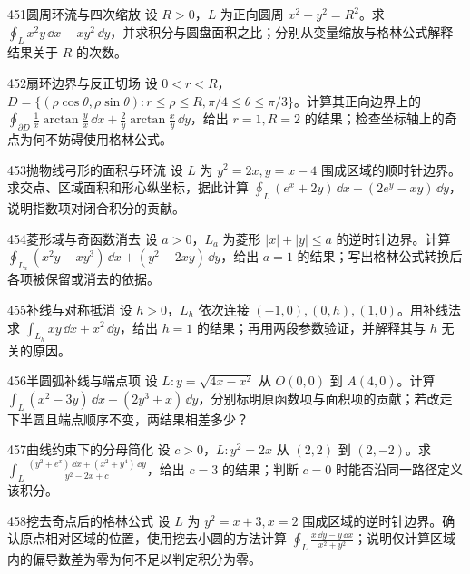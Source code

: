 \begin{exercise}{451}{圆周环流与四次缩放}
设 $R>0$，$L$ 为正向圆周 $x^2+y^2=R^2$。求 $\oint_Lx^2y\,\dd x-xy^2\,\dd y$，并求积分与圆盘面积之比；分别从变量缩放与格林公式解释结果关于 $R$ 的次数。
\end{exercise}

\begin{exercise}{452}{扇环边界与反正切场}
设 $0<r<R$，$D=\{(\rho\cos\theta,\rho\sin\theta):r\leq\rho\leq R,\pi/4\leq\theta\leq\pi/3\}$。计算其正向边界上的
$\oint_{\partial D}\frac1x\arctan\frac yx\,\dd x+\frac2y\arctan\frac xy\,\dd y$，给出 $r=1,R=2$ 的结果；检查坐标轴上的奇点为何不妨碍使用格林公式。
\end{exercise}

\begin{exercise}{453}{抛物线弓形的面积与环流}
设 $L$ 为 $y^2=2x,y=x-4$ 围成区域的顺时针边界。求交点、区域面积和形心纵坐标，据此计算 $\oint_L(e^x+2y)\,\dd x-(2e^y-xy)\,\dd y$，说明指数项对闭合积分的贡献。
\end{exercise}

\begin{exercise}{454}{菱形域与奇函数消去}
设 $a>0$，$L_a$ 为菱形 $|x|+|y|\leq a$ 的逆时针边界。计算 $\oint_{L_a}(x^2y-xy^3)\,\dd x+(y^2-2xy)\,\dd y$，给出 $a=1$ 的结果；写出格林公式转换后各项被保留或消去的依据。
\end{exercise}

\begin{exercise}{455}{补线与对称抵消}
设 $h>0$，$L_h$ 依次连接 $(-1,0),(0,h),(1,0)$。用补线法求 $\int_{L_h}xy\,\dd x+x^2\,\dd y$，给出 $h=1$ 的结果；再用两段参数验证，并解释其与 $h$ 无关的原因。
\end{exercise}

\begin{exercise}{456}{半圆弧补线与端点项}
设 $L:y=\sqrt{4x-x^2}$ 从 $O(0,0)$ 到 $A(4,0)$。计算 $\int_L(x^2-3y)\,\dd x+(2y^3+x)\,\dd y$，分别标明原函数项与面积项的贡献；若改走下半圆且端点顺序不变，两结果相差多少？
\end{exercise}

\begin{exercise}{457}{曲线约束下的分母简化}
设 $c>0$，$L:y^2=2x$ 从 $(2,2)$ 到 $(2,-2)$。求
$\int_L\frac{(y^2+e^x)\,\dd x+(x^2+y^4)\,\dd y}{y^2-2x+c}$，给出 $c=3$ 的结果；判断 $c=0$ 时能否沿同一路径定义该积分。
\end{exercise}

\begin{exercise}{458}{挖去奇点后的格林公式}
设 $L$ 为 $y^2=x+3,x=2$ 围成区域的逆时针边界。确认原点相对区域的位置，使用挖去小圆的方法计算 $\oint_L\frac{x\,\dd y-y\,\dd x}{x^2+y^2}$；说明仅计算区域内的偏导数差为零为何不足以判定积分为零。
\end{exercise}


